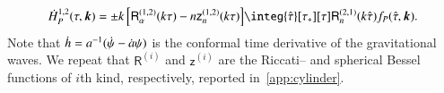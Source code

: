    \begin{equation}\label{eq:pertwalls:gws:Hdot_P_12}
        \dot{H}_P^{1,2}(\tau, \vec{k})  = \pm k \,\bclosed{ \mathsf{R}_\alpha^{(1,2)}(k\tau) -  n\mathsf{z}^{(1,2)}_n(k\tau) } \integ{\dummy{\tau}}[\tau_\ast][\tau] \mathsf{R}_n^{(2,1)}(k\dummy{\tau})  \Src_P(\dummy{\tau}, \vec{k}).
    \end{equation}
    Note that $\dot{h} = a^{-1} ( \dot{\psi} - \dot{a} \psi)$ is the conformal time derivative of the gravitational waves. 
    We repeat that $\mathsf{R}^{(i)}$ and $\mathsf{z}^{(i)}$ are the Riccati-- and spherical Bessel functions of $i$th kind, respectively, reported in~\cref{app:cylinder}.






